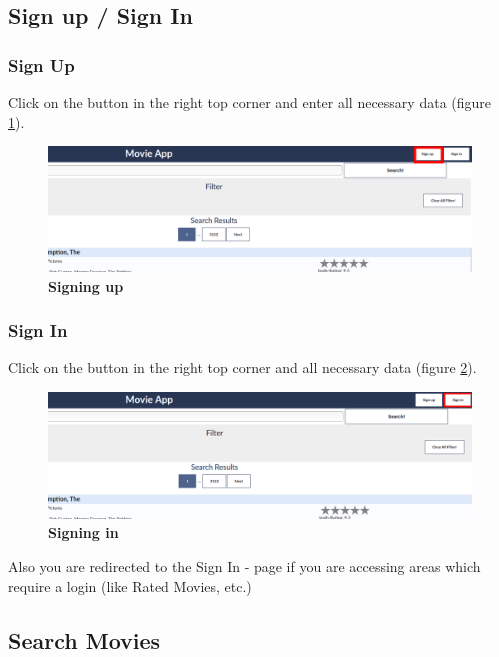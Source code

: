 \documentclass{article}
\begin{document}
\subsection{Sign up / Sign In}

\subsubsection{Sign Up}

Click on the button in the right top corner and enter all necessary data (figure \ref{fig_sign_up}).
\begin{figure}[t!]
\includegraphics[scale=0.3]{screenshots_app/sign_up.png}
\caption{\textbf{Signing up}}\label{fig_sign_up}
\end{figure}

\subsubsection{Sign In}

Click on the button in the right top corner and all necessary data (figure \ref{fig_sign_in}).
\begin{figure}[t!]
\includegraphics[scale=0.3]{screenshots_app/sign_in.png}
\caption{\textbf{Signing in}}\label{fig_sign_in}
\end{figure}
Also you are redirected to the Sign In - page if you are accessing areas which require a login (like Rated Movies, etc.)


\subsection{Search Movies}
\end{document}
